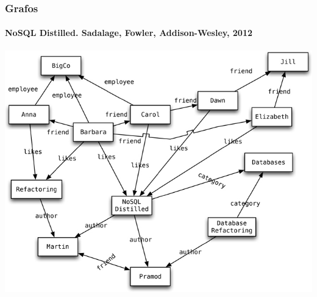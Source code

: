 \documentclass[14pt]{beamer}
\begin{document}




\begin{frame}
  \frametitle{Grafos}
  \framesubtitle{NoSQL Distilled. Sadalage, Fowler, Addison-Wesley, 2012}
\centering\includegraphics[width=.8\textwidth]{img/graph_example}
\end{frame}
\end{document}
